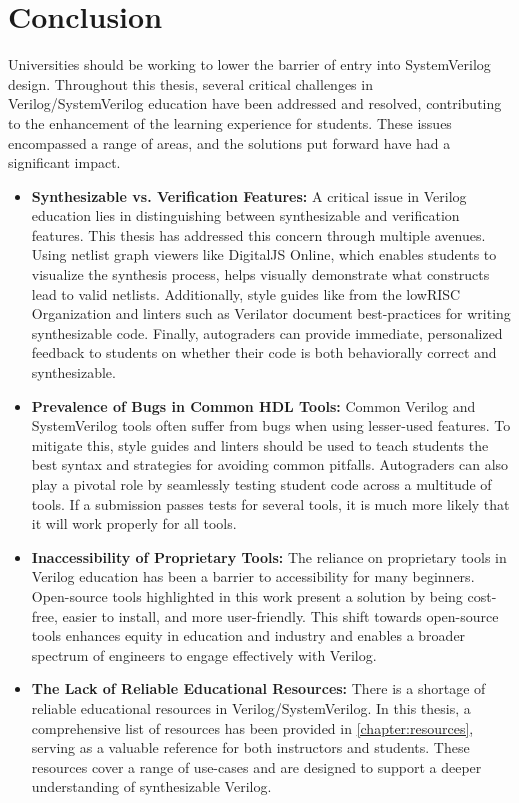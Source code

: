
\chapter{Conclusion}
\label{chapter:conclusion}

Universities should be working to lower the barrier of entry into SystemVerilog design. Throughout this thesis, several critical challenges in Verilog/SystemVerilog education have been addressed and resolved, contributing to the enhancement of the learning experience for students. These issues encompassed a range of areas, and the solutions put forward have had a significant impact.

\begin{itemize}
    \item \textbf{Synthesizable vs. Verification Features:} A critical issue in Verilog education lies in distinguishing between synthesizable and verification features. This thesis has addressed this concern through multiple avenues. Using netlist graph viewers like DigitalJS Online, which enables students to visualize the synthesis process, helps visually demonstrate what constructs lead to valid netlists. Additionally, style guides like from the lowRISC Organization and linters such as Verilator document best-practices for writing synthesizable code. Finally, autograders can provide immediate, personalized feedback to students on whether their code is both behaviorally correct and synthesizable.
    \item \textbf{Prevalence of Bugs in Common HDL Tools:} Common Verilog and SystemVerilog tools often suffer from bugs when using lesser-used features. To mitigate this, style guides and linters should be used to teach students the best syntax and strategies for avoiding common pitfalls. Autograders can also play a pivotal role by seamlessly testing student code across a multitude of tools. If a submission passes tests for several tools, it is much more likely that it will work properly for all tools.
    \item \textbf{Inaccessibility of Proprietary Tools:} The reliance on proprietary tools in Verilog education has been a barrier to accessibility for many beginners. Open-source tools highlighted in this work present a solution by being cost-free, easier to install, and more user-friendly. This shift towards open-source tools enhances equity in education and industry and enables a broader spectrum of engineers to engage effectively with Verilog.
    \item \textbf{The Lack of Reliable Educational Resources:} There is a shortage of reliable educational resources in Verilog/SystemVerilog. In this thesis, a comprehensive list of resources has been provided in \autoref{chapter:resources}, serving as a valuable reference for both instructors and students. These resources cover a range of use-cases and are designed to support a deeper understanding of synthesizable Verilog.

\end{itemize}
